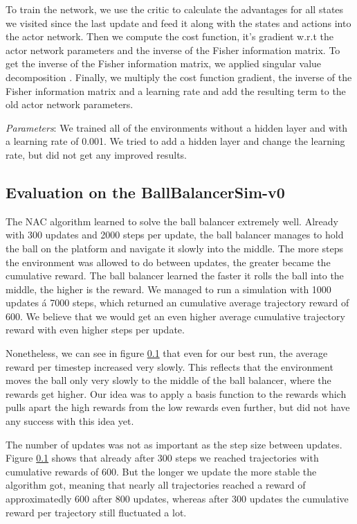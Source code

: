 To train the network, we use the critic to calculate the advantages for all states we visited since the last update and feed it along with the states and actions into the actor network. Then we compute the cost function, it's gradient w.r.t the actor network parameters and the inverse of the Fisher information matrix. To get the inverse of the Fisher information matrix, we applied singular value decomposition \citep{golub1965calculating}. Finally, we multiply the cost function gradient, the inverse of the Fisher information matrix and a learning rate and add the resulting term to the old actor network parameters.

\textit{Parameters}: We trained all of the environments without a hidden layer and with a learning rate of 0.001. We tried to add a hidden layer and change the learning rate, but did not get any improved results.

\subsection{Evaluation on the BallBalancerSim-v0}

The NAC algorithm learned to solve the ball balancer extremely well. Already with 300 updates and 2000 steps per update, the ball balancer manages to hold the ball on the platform and navigate it slowly into the middle. The more steps the environment was allowed to do between updates, the greater became the cumulative reward. The ball balancer learned the faster it rolls the ball into the middle, the higher is the reward. We managed to run a simulation with 1000 updates á 7000 steps, which returned an cumulative average trajectory reward of 600. We believe that we would get an even higher average cumulative trajectory reward with even higher steps per update. 

Nonetheless, we can see in figure \ref{} that even for our best run, the average reward per timestep increased very slowly. This reflects that the environment moves the ball only very slowly to the middle of the ball balancer, where the rewards get higher. Our idea was to apply a basis function to the rewards which pulls apart the high rewards from the low rewards even further, but did not have any success with this idea yet.

The number of updates was not as important as the step size between updates. Figure \ref{} shows that already after 300 steps we reached trajectories with cumulative rewards of 600. But the longer we update the more stable the algorithm got, meaning that nearly all trajectories reached a reward of approximatedly 600 after 800 updates, whereas after 300 updates the cumulative reward per trajectory still fluctuated a lot. 

